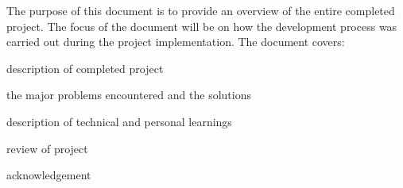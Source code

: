 The purpose of this document is to provide an overview of the entire completed project. The focus of the document will be on how the development process was carried out during the project implementation. The document covers\+:
\begin{DoxyItemize}
\item description of completed project
\item the major problems encountered and the solutions
\item description of technical and personal learnings
\item review of project
\item acknowledgement 
\end{DoxyItemize}